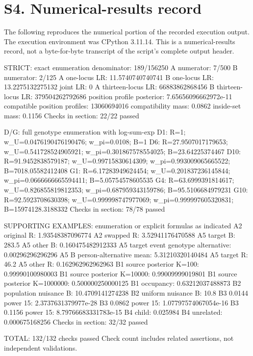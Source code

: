 \documentclass[
]{article}
\newenvironment{Shaded}{}{}
\newcommand{\NormalTok}[1]{#1}
\begin{document}
\section{S4. Numerical-results
record}\label{s4.-numerical-results-record}

The following reproduces the numerical portion of the recorded execution
output. The execution environment was CPython 3.11.14. This is a
numerical-results record, not a byte-for-byte transcript of the script's
complete output header.

\begin{Shaded}
\begin{Highlighting}[]
\NormalTok{STRICT: exact enumeration}
\NormalTok{denominator: 189/156250}
\NormalTok{A numerator: 7/500}
\NormalTok{B numerator: 2/125}
\NormalTok{A one{-}locus LR: 11.5740740740741}
\NormalTok{B one{-}locus LR: 13.2275132275132}
\NormalTok{joint LR: 0}
\NormalTok{A thirteen{-}locus LR: 66883862868456}
\NormalTok{B thirteen{-}locus LR: 379504262792686}
\NormalTok{position profile posterior: 7.65656096662972e{-}11}
\NormalTok{compatible position profiles: 13060694016}
\NormalTok{compatibility mass: 0.0862}
\NormalTok{inside{-}set mass: 0.1156}
\NormalTok{Checks in section: 22/22 passed}

\NormalTok{D/G: full genotype enumeration with log{-}sum{-}exp}
\NormalTok{D1: R=1; w\_U=0.0476190476190476; w\_pi=0.0108; B=1}
\NormalTok{D6: R=27.9507017179653; w\_U=0.541728524905921; w\_pi=0.301867578554025; B=23.64225374467}
\NormalTok{D10: R=91.9452838579187; w\_U=0.99715830614309; w\_pi=0.993009065665522; B=7018.05582412408}
\NormalTok{G1: R=6.17283949624454; w\_U=0.201837236145844; w\_pi=0.0666666665594411; B=5.05754578605535}
\NormalTok{G4: R=63.6999391814617; w\_U=0.826855819812353; w\_pi=0.687959343159786; B=95.5106684979231}
\NormalTok{G10: R=92.5923708630398; w\_U=0.999998747977069; w\_pi=0.999997605320831; B=15974128.3188332}
\NormalTok{Checks in section: 78/78 passed}

\NormalTok{SUPPORTING EXAMPLES: enumeration or explicit formulas as indicated}
\NormalTok{A2 original R: 1.93548387096774}
\NormalTok{A2 swapped R: 3.52941176470588}
\NormalTok{A5 target B: 283.5}
\NormalTok{A5 other B: 0.160475482912333}
\NormalTok{A5 target event genotype alternative: 0.00296296296296}
\NormalTok{A5 B person{-}alternative mean: 5.31210320140484}
\NormalTok{A5 target R: 46.2}
\NormalTok{A5 other R: 0.162962962962963}
\NormalTok{B1 source posterior K=100: 0.99990100980003}
\NormalTok{B1 source posterior K=10000: 0.99009999019801}
\NormalTok{B1 source posterior K=1000000: 0.500000250000125}
\NormalTok{B1 occupancy: 0.63212037488873}
\NormalTok{B2 population nuisance B: 10.4709141274238}
\NormalTok{B2 uniform nuisance B: 10.8}
\NormalTok{B3 0.0144 power 15: 2.3737631379977e{-}28}
\NormalTok{B3 0.0862 power 15: 1.07797574067054e{-}16}
\NormalTok{B3 0.1156 power 15: 8.79766683331783e{-}15}
\NormalTok{B4 child: 0.025984}
\NormalTok{B4 unrelated: 0.000675168256}
\NormalTok{Checks in section: 32/32 passed}

\NormalTok{TOTAL: 132/132 checks passed}
\NormalTok{Check count includes related assertions, not independent validations.}
\end{Highlighting}
\end{Shaded}
\end{document}
